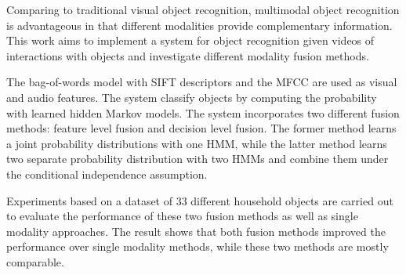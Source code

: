 \documentclass[a4paper,11pt]{article} %
\begin{document}
Comparing to traditional visual object recognition, multimodal object recognition is advantageous in that different modalities provide complementary information. This work aims to implement a system for object recognition given videos of interactions with objects and investigate different modality fusion methods.

The bag-of-words model with SIFT descriptors and the MFCC are used as visual and audio features. The system classify objects by computing the probability with learned hidden Markov models. The system incorporates two different fusion methods: feature level fusion and decision level fusion. The former method learns a joint probability distributions with one HMM, while the latter method learns two separate probability distribution with two HMMs and combine them under the conditional independence assumption.

Experiments based on a dataset of 33 different household objects are carried out to evaluate the performance of these two fusion methods as well as single modality approaches. The result shows that both fusion methods improved the performance over single modality methods, while these two methods are mostly comparable. 
 
\end{document}
